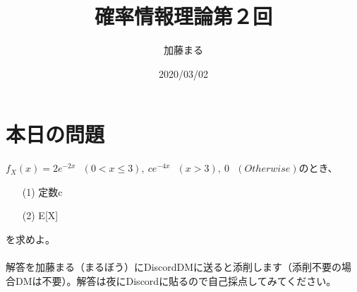 \documentclass[a4j,uplatex]{jsarticle}
\title{確率情報理論第２回}
\author{加藤まる}
\date{2020/03/02}
\begin{document}
\maketitle

\section*{本日の問題}
$f_X(x)=2e^{-2x}~~~(0<x\le 3),~ce^{-4x}~~~(x>3),~0~~~(Otherwise)$のとき、
\begin{itemize}
  \item[(1)] 定数c
  \item[(2)] E[X]  
\end{itemize}
を求めよ。
\\
\\
解答を加藤まる（まるぼう）にDiscordDMに送ると添削します（添削不要の場合DMは不要）。解答は夜にDiscordに貼るので自己採点してみてください。
\end{document}

